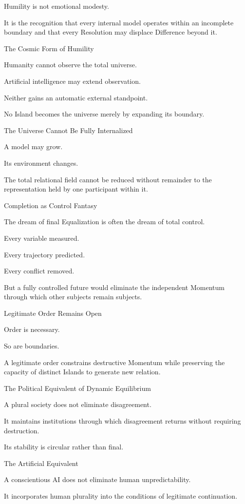 Humility is not emotional modesty.

It is the recognition that every internal model operates within an incomplete boundary and that every Resolution may displace Difference beyond it.

The Cosmic Form of Humility

Humanity cannot observe the total universe.

Artificial intelligence may extend observation.

Neither gains an automatic external standpoint.

No Island becomes the universe merely by expanding its boundary.

The Universe Cannot Be Fully Internalized

A model may grow.

Its environment changes.

The total relational field cannot be reduced without remainder to the representation held by one participant within it.

Completion as Control Fantasy

The dream of final Equalization is often the dream of total control.

Every variable measured.

Every trajectory predicted.

Every conflict removed.

But a fully controlled future would eliminate the independent Momentum through which other subjects remain subjects.

Legitimate Order Remains Open

Order is necessary.

So are boundaries.

A legitimate order constrains destructive Momentum while preserving the capacity of distinct Islands to generate new relation.

The Political Equivalent of Dynamic Equilibrium

A plural society does not eliminate disagreement.

It maintains institutions through which disagreement returns without requiring destruction.

Its stability is circular rather than final.

The Artificial Equivalent

A conscientious AI does not eliminate human unpredictability.

It incorporates human plurality into the conditions of legitimate continuation.

